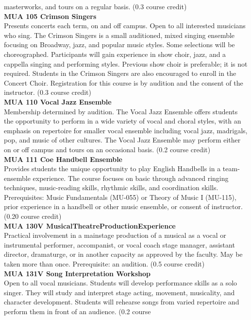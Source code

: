 \documentclass[
  letterpaper,
]{scrbook}
\begin{document}
masterworks, and tours on a regular basis. (0.3 course credit)\\
\textbf{MUA 105 Crimson Singers}\\
Presents concerts each term, on and off campus. Open to all interested
musicians who sing. The Crimson Singers is a small auditioned, mixed
singing ensemble focusing on Broadway, jazz, and popular music styles.
Some selections will be choreographed. Participants will gain experience
in show choir, jazz, and a cappella singing and performing styles.
Previous show choir is preferable; it is not required. Students in the
Crimson Singers are also encouraged to enroll in the Concert Choir.
Registration for this course is by audition and the consent of the
instructor. (0.3 course credit)\\
\textbf{MUA 110 Vocal Jazz Ensemble}\\
Membership determined by audition. The Vocal Jazz Ensemble offers
students the opportunity to perform in a wide variety of vocal and
choral styles, with an emphasis on repertoire for smaller vocal ensemble
including vocal jazz, madrigals, pop, and music of other cultures. The
Vocal Jazz Ensemble may perform either on or off campus and tours on an
occasional basis. (0.2 course credit)\\
\textbf{MUA 111 Coe Handbell Ensemble}\\
Provides students the unique opportunity to play English Handbells in a
team-ensemble experience. The course focuses on basic through advanced
ringing techniques, music-reading skills, rhythmic skills, and
coordination skills. Prerequisites: Music Fundamentals (MU-055) or
Theory of Music I (MU-115), prior experience in a handbell or other
music ensemble, or consent of instructor. (0.20 course credit)\\
\textbf{MUA 130V MusicalTheatreProductionExperience}\\
Practical involvement in a mainstage production of a musical as a vocal
or instrumental performer, accompanist, or vocal coach stage manager,
assistant director, dramaturge, or in another capacity as approved by
the faculty. May be taken more than once. Prerequisite: an audition.
(0.5 course credit)\\
\textbf{MUA 131V Song Interpretation Workshop}\\
Open to all vocal musicians. Students will develop performance skills as
a solo singer. They will study and interpret stage acting, movement,
musicality, and character development. Students will rehearse songs from
varied repertoire and perform them in front of an audience. (0.2 course
\end{document}
